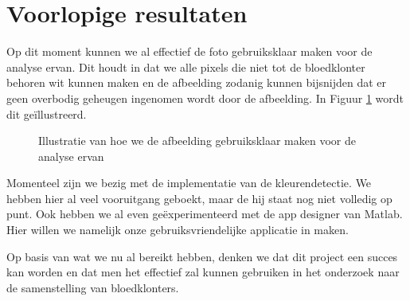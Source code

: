\documentclass[a4paper]{article}
\begin{document}
	\section{Voorlopige resultaten}		
		Op dit moment kunnen we al effectief de foto gebruiksklaar maken voor de analyse ervan. Dit houdt in dat we alle pixels die niet tot de bloedklonter behoren wit kunnen maken en de afbeelding zodanig kunnen bijsnijden dat er geen overbodig geheugen ingenomen wordt door de afbeelding. In Figuur \ref{fig: voorna} wordt dit geïllustreerd.
		
		\begin{figure}[H]
			\centering
			\qquad

			\caption{Illustratie van hoe we de afbeelding gebruiksklaar maken voor de analyse ervan}
			\label{fig: voorna}
		\end{figure}
	
		Momenteel zijn we bezig met de implementatie van de kleurendetectie. We hebben hier al veel vooruitgang geboekt, maar de hij staat nog niet volledig op punt. Ook hebben we al even geëxperimenteerd met de app designer van Matlab. Hier willen we namelijk onze gebruiksvriendelijke applicatie in maken.
		
		Op basis van wat we nu al bereikt hebben, denken we dat dit project een succes kan worden en dat men het effectief zal kunnen gebruiken in het onderzoek naar de samenstelling van bloedklonters.
	
\end{document}
